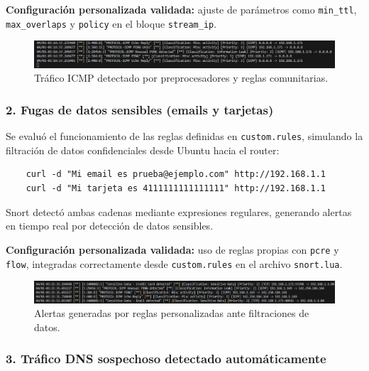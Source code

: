 \documentclass[11pt,a4paper,twoside]{report}
\begin{document}
\textbf{Configuración personalizada validada:} ajuste de parámetros como \texttt{min\_ttl}, \texttt{max\_overlaps} y \texttt{policy} en el bloque \texttt{stream\_ip}.

\begin{figure}[H]
	\centering
	\includegraphics[width=\textwidth]{pruebas/3.png}
	\caption{Tráfico ICMP detectado por preprocesadores y reglas comunitarias.}
\end{figure}

\vspace{0.5cm}

\subsubsection*{2. Fugas de datos sensibles (emails y tarjetas)}

Se evaluó el funcionamiento de las reglas definidas en \texttt{custom.rules}, simulando la filtración de datos confidenciales desde Ubuntu hacia el router:

\begin{verbatim}
	curl -d "Mi email es prueba@ejemplo.com" http://192.168.1.1
	curl -d "Mi tarjeta es 4111111111111111" http://192.168.1.1
\end{verbatim}

Snort detectó ambas cadenas mediante expresiones regulares, generando alertas en tiempo real por detección de datos sensibles.\newline

\textbf{Configuración personalizada validada:} uso de reglas propias con \texttt{pcre} y \texttt{flow}, integradas correctamente desde \texttt{custom.rules} en el archivo \texttt{snort.lua}.

\begin{figure}[H]
	\centering
	\includegraphics[width=\textwidth]{pruebas/4.png}
	\caption{Alertas generadas por reglas personalizadas ante filtraciones de datos.}
\end{figure}

\vspace{0.5cm}

\subsubsection*{3. Tráfico DNS sospechoso detectado automáticamente}
\end{document}
